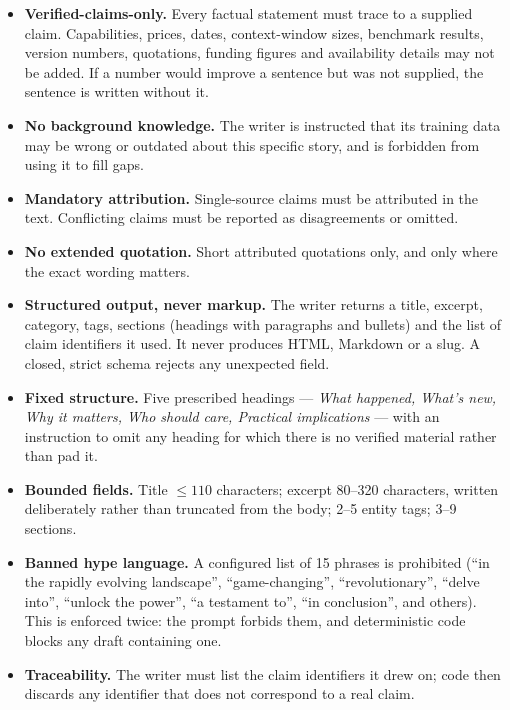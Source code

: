 \documentclass[11pt,a4paper]{article}
\begin{document}
\begin{itemize}[leftmargin=1.2em,itemsep=0.25em]
  \item \textbf{Verified-claims-only.} Every factual statement must trace to a
    supplied claim. Capabilities, prices, dates, context-window sizes, benchmark
    results, version numbers, quotations, funding figures and availability details
    may not be added. If a number would improve a sentence but was not supplied,
    the sentence is written without it.
  \item \textbf{No background knowledge.} The writer is instructed that its
    training data may be wrong or outdated about this specific story, and is
    forbidden from using it to fill gaps.
  \item \textbf{Mandatory attribution.} Single-source claims must be attributed in
    the text. Conflicting claims must be reported as disagreements or omitted.
  \item \textbf{No extended quotation.} Short attributed quotations only, and only
    where the exact wording matters.
  \item \textbf{Structured output, never markup.} The writer returns a title,
    excerpt, category, tags, sections (headings with paragraphs and bullets) and
    the list of claim identifiers it used. It never produces HTML, Markdown or a
    slug. A closed, strict schema rejects any unexpected field.
  \item \textbf{Fixed structure.} Five prescribed headings --- \emph{What happened,
    What's new, Why it matters, Who should care, Practical implications} --- with
    an instruction to omit any heading for which there is no verified material
    rather than pad it.
  \item \textbf{Bounded fields.} Title $\leq 110$ characters; excerpt 80--320
    characters, written deliberately rather than truncated from the body;
    2--5 entity tags; 3--9 sections.
  \item \textbf{Banned hype language.} A configured list of 15 phrases is
    prohibited (``in the rapidly evolving landscape'', ``game-changing'',
    ``revolutionary'', ``delve into'', ``unlock the power'', ``a testament to'',
    ``in conclusion'', and others). This is enforced twice: the prompt forbids
    them, and deterministic code blocks any draft containing one.
  \item \textbf{Traceability.} The writer must list the claim identifiers it drew
    on; code then discards any identifier that does not correspond to a real
    claim.
\end{itemize}
\end{document}
